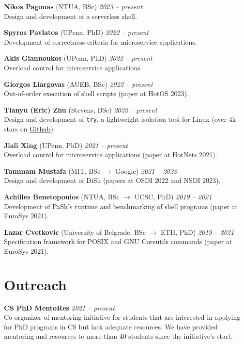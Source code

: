 \documentclass[margin]{res}
\begin{document}
\begin{resume}
\textbf{Nikos Pagonas} (NTUA, BSc) \hfill {\em 2023 -- present} \\
Design and development of a serverless shell.

\textbf{Spyros Pavlatos} (UPenn, PhD) \hfill {\em 2022 -- present} \\
Development of correctness criteria for microservice applications.

\textbf{Akis Giannoukos} (UPenn, PhD) \hfill {\em 2022 -- present} \\
Overload control for microservice applications.

\textbf{Giorgos Liargovas} (AUEB, BSc) \hfill {\em 2022 -- present} \\
Out-of-order execution of shell scripts (paper at HotOS 2023).

\textbf{Tianyu (Eric) Zhu} (Stevens, BSc) \hfill {\em 2022 -- present} \\
Design and development of \texttt{try}, a lightweight isolation tool for Linux (over 4k stars on \href{https://github.com/binpash/try}{Github}).

\textbf{Jiali Xing} (UPenn, PhD) \hfill {\em 2021 -- present} \\
Overload control for microservice applications (paper at HotNets 2021).

\textbf{Tammam Mustafa} (MIT, BSc $\rightarrow$ Google) \hfill {\em 2021 -- 2023} \\
Design and development of DiSh (papers at OSDI 2022 and NSDI 2023).

\textbf{Achilles Benetopoulos} (NTUA, BSc $\rightarrow$ UCSC, PhD) \hfill {\em 2019 -- 2021} \\
Development of PaSh's runtime and benchmarking of shell programs (paper at EuroSys 2021). 

\textbf{Lazar Cvetkovic} (University of Belgrade, BSc $\rightarrow$ ETH, PhD) \hfill {\em 2019 -- 2021} \\
Specification framework for POSIX and GNU Coreutils commands (paper at EuroSys 2021). 


\section{Outreach}

\textbf{CS PhD MentoRes}  \hfill {\em 2021 -- present} \\
Co-organizer of mentoring initiative for students that are interested in applying for PhD programs in CS but lack adequate resources. We have provided mentoring and resources to more than 40 students since the initiative's start.


\end{resume}
\end{document}
